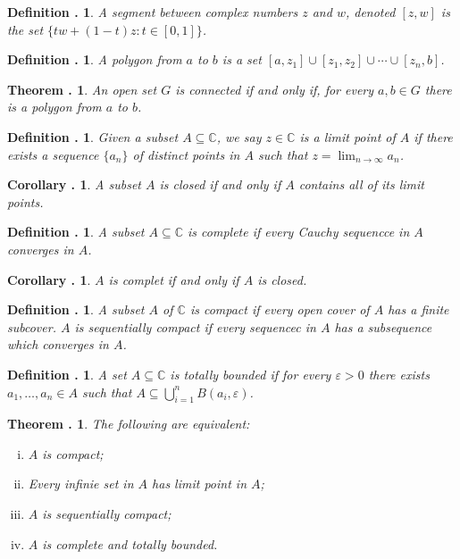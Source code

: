 \documentclass[twoside]{report}
\newcommand{\C}{\mathbb{C}}
\newcounter{Lecture}
\theoremstyle{myts}
\newcounter{c}[Lecture]
\newtheorem{dfn}[c]{Definition \arabic{Lecture}.}
\newtheorem{thm}[c]{Theorem \arabic{Lecture}.}
\newtheorem{cor}[c]{Corollary \arabic{Lecture}.}
\newcounter{ex}[Lecture]
\begin{document}
\begin{dfn}
  A \emph{segment} between complex numbers $z$ and $w$, denoted \( [z,w] \) is the set \( \{ tw + (1-t)z : t\in [0,1] \} \).
\end{dfn}

\begin{dfn}
  A \emph{polygon} from $a$ to $b$ is a set \( [a,z_1] \cup [z_1,z_2] \cup \cdots \cup [z_n,b] \).
\end{dfn}

\begin{thm}
  An open set $G$ is connected if and only if, for every \(a,b\in G\) there is a polygon from $a$ to $b$.
\end{thm}

\begin{dfn}
  Given a subset \( A\subseteq \C\), we say \(z\in\C\) is a \emph{limit point} of $A$ if there exists a sequence \(\{a_n\}\) of distinct points in $A$ such that \( z = \lim_{n\to\infty} a_n \).
\end{dfn}

\begin{cor}
  A subset $A$ is closed if and only if $A$ contains all of its limit points.
\end{cor}

\begin{dfn}
  A subset \(A \subseteq\C\) is \emph{complete} if every Cauchy sequencce in $A$ converges in $A$.
\end{dfn}

\begin{cor}
  $A$ is complet if and only if $A$ is closed.
\end{cor}

\begin{dfn}
  A subset $A$ of $\C$ is \emph{compact} if every open cover of $A$ has a finite subcover. $A$ is \emph{sequentially compact} if every sequencec in $A$ has a subsequence which converges in $A$. 
\end{dfn}

\begin{dfn}
  A set \(A\subseteq\C\) is \emph{totally bounded} if for every \(\varepsilon > 0\) there exists \( a_1, \ldots, a_n \in A \) such that \( A\subseteq \bigcup_{i=1}^n B(a_i, \varepsilon)\). 
\end{dfn}

\begin{thm}
  The following are equivalent:
  \begin{enumerate}[(i)]
    \item $A$ is compact;
    \item Every infinie set in $A$ has limit point in $A$;
    \item $A$ is sequentially compact;
    \item $A$ is complete and totally bounded.
  \end{enumerate}
\end{thm}
\end{document}
